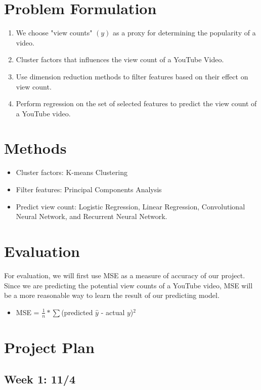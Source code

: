 \documentclass[english]{article}
\begin{document}
\section{Problem Formulation}

\begin{enumerate}
    \item We choose "view counts" $(y)$ as a proxy for determining the popularity of a video.
    \item Cluster factors that influences the view count of a YouTube Video.
    \item Use dimension reduction methods to filter features based on their effect on view count.
    \item Perform regression on the set of selected features to predict the view count of a YouTube video.
\end{enumerate}

\section{Methods}
\begin{itemize}
    \item Cluster factors: K-means Clustering
    \item Filter features: Principal Components Analysis 
    \item Predict view count: Logistic Regression, Linear Regression, Convolutional Neural Network, and Recurrent Neural Network.
\end{itemize}

\section{Evaluation}
For evaluation, we will first use MSE as a measure of accuracy of our project. Since we are predicting the potential view counts of a YouTube video, MSE will be a more reasonable way to learn the result of our predicting model.
\begin{itemize}
    \item MSE = $\frac{1}{n}*\sum$(predicted $\hat{y}$  - actual $y$)$^2$
\end{itemize} 
\section{Project Plan}
\subsection*{Week 1: 11/4}
\end{document}
